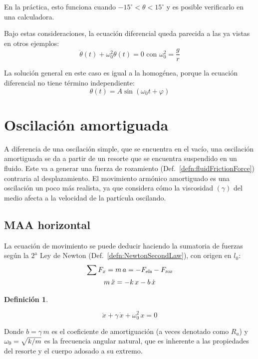 \documentclass[a5paper,12pt,twoside]{book}
\newtheorem{defn}{{Definición}}[chapter]
\begin{document}
En la práctica, esto funciona cuando $-15^{\circ}<\theta<15^{\circ}$ y es posible verificarlo en una calculadora.

Bajo estas consideraciones, la ecuación diferencial queda parecida a las ya vistas en otros ejemplos:
\[ \ddot{\theta} (t) + \omega_0^2 \theta (t) = 0 \text{ con } \omega_0^2 = \frac{g}{r}\]

La solución general en este caso es igual a la homogénea, porque la ecuación diferencial no tiene término independiente:
\[ \theta(t) = A \sin(\omega_0 t + \varphi) \]


\section{Oscilación amortiguada}
A diferencia de una oscilación simple, que se encuentra en el vacío, una oscilación amortiguada se da a partir de un resorte que se encuentra suspendido en un fluido. Este va a generar una fuerza de rozamiento (Def.\ \ref{defn:fluidFrictionForce}) contraria al desplazamiento. El movimiento armónico amortiguado es una oscilación un poco más realista, ya que considera cómo la viscosidad $(\gamma)$ del medio afecta a la velocidad de la partícula oscilando. 


\subsection{MAA horizontal}

La ecuación de movimiento se puede deducir haciendo la sumatoria de fuerzas según la $2^{\text{a}}$ Ley de Newton (Def.\ \ref{defn:NewtonSecondLaw}), con origen en $l_0$:
\begin{gather*}
    \sum F_x = m \, a = - {{F}_\textsl{{ela}}} - {{F}_\textsl{{roz}}}
    \\
    m \, \ddot{x} = - k \, x - b \, \dot{x}
\end{gather*}

\begin{mdframed}[style=MyFrame1]
    \begin{defn}
    \end{defn}
    \begin{equation*}
        \ddot{x} + \gamma \, \dot{x} + \omega_0^2 \, x  = 0
    \end{equation*}
\end{mdframed}

Donde $b=\gamma \, m$ es el coeficiente de amortiguación (a veces denotado como $R_a$) y $\omega_0=\sqrt{k/m}$ es la frecuencia angular natural, que es inherente a las propiedades del resorte y el cuerpo adosado a su extremo.
\end{document}
